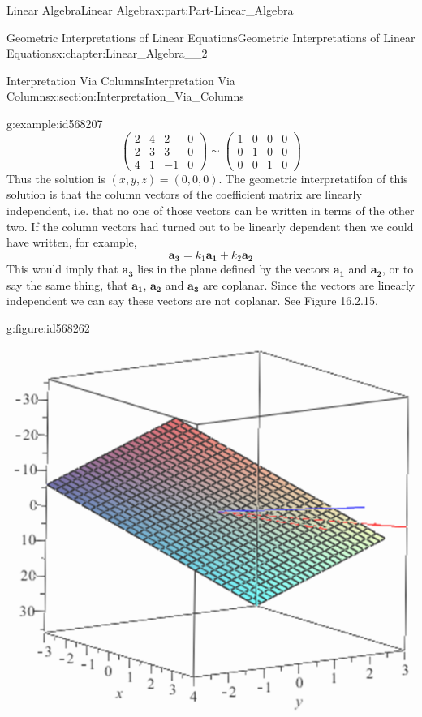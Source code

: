 \documentclass[oneside,10pt,]{book}
\numberwithin{equation}{section}
\newcommand{\amp}{&}
\begin{document}
\begin{partptx}{Linear Algebra}{}{Linear Algebra}{}{}{x:part:Part-Linear_Algebra}
\begin{chapterptx}{Geometric Interpretations of Linear Equations}{}{Geometric Interpretations of Linear Equations}{}{}{x:chapter:Linear_Algebra__2}
\begin{sectionptx}{Interpretation Via Columns}{}{Interpretation Via Columns}{}{}{x:section:Interpretation_Via_Columns}
\begin{example}{}{g:example:id568207}
\begin{equation*}
\begin{pmatrix} 2 \amp 4 \amp 2 \amp 0 \\ 2 \amp 3 \amp 3 \amp 0 \\ 4 \amp 1 \amp -1 \amp 0 \end{pmatrix} \sim \begin{pmatrix} 1 \amp 0 \amp 0 \amp 0 \\ 0 \amp 1 \amp 0 \amp 0 \\ 0 \amp 0 \amp 1 \amp 0 \end{pmatrix} 
\end{equation*}
Thus the solution is \((x,y,z)=(0,0,0)\). The geometric interpretatifon of this solution is that the column vectors of the coefficient matrix are linearly independent, i.e. that no one of those vectors can be written in terms of the other two. If the column vectors had turned out to be linearly dependent then we could have written, for example,%
\begin{equation*}
\mathbf{a_3}=k_1\mathbf{a_1}+k_2\mathbf{a_2}
\end{equation*}
This would imply that \(\mathbf{a_3}\) lies in the plane defined by the vectors \(\mathbf{a_1}\) and \(\mathbf{a_2}\), or to say the same thing, that  \(\mathbf{a_1}\), \(\mathbf{a_2}\) and \(\mathbf{a_3}\) are coplanar. Since the vectors are linearly independent we can say these vectors are not coplanar. See Figure 16.2.15. \begin{figureptx}{}{g:figure:id568262}{}%
\begin{image}{0.2}{0.6}{0.2}%
\includegraphics[width=\linewidth]{./LinearAlgebra/Images/2/figure7.png}

\end{image}
\end{figureptx}
\end{example}
\end{sectionptx}
\end{chapterptx}
\end{partptx}
\end{document}
